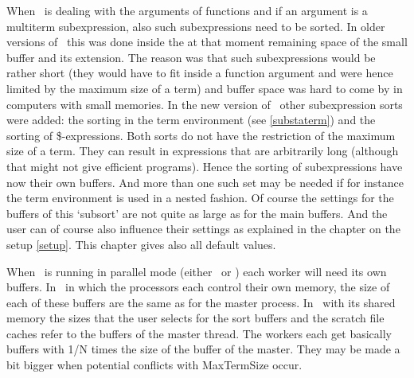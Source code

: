 When \FORM\ is dealing with the arguments of 
functions and if an argument is a multiterm subexpression, also such 
subexpressions need to be sorted. In older versions of \FORM\ this was done 
inside the at that moment remaining space of the small buffer and its 
extension. The reason was that such subexpressions would be rather short 
(they would have to fit inside a function argument and were hence limited 
by the maximum size of a term) and buffer space was hard to come by in 
computers with small memories. In the new version of \FORM\ other 
subexpression sorts were added: the sorting in the term environment (see 
\ref{substaterm}) and the sorting of \$-expressions. Both sorts do not have 
the restriction of the maximum size of a term. They can result in 
expressions that are arbitrarily long (although that might not give 
efficient programs). Hence the sorting of subexpressions have now their own 
buffers. And more than one such set may be needed if for instance the term 
environment is used in a nested fashion. Of course the settings for the 
buffers of this `subsort' are not quite as large as for the main buffers. 
And the user can of course also influence their settings as explained in 
the chapter on the setup \ref{setup}. This chapter gives also all default 
values.

When \FORM\ is running in parallel mode (either \TFORM\ or \ParFORM) each worker 
will need its own buffers. In \ParFORM\ in which the processors each control 
their own memory, the size of each of these buffers are the same as for the 
master process. In \TFORM\ with its shared memory the sizes that the user 
selects for the sort buffers and the scratch file caches refer to the 
buffers of the master thread. The workers each get basically buffers with 
1/N times the size of the buffer of the master. They may be made a bit 
bigger when potential conflicts with MaxTermSize occur.

